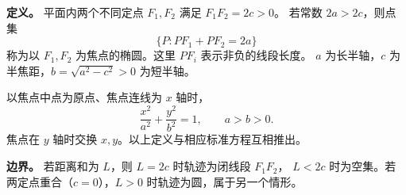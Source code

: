 \begin{statementbox}
\textbf{定义。} 平面内两个不同定点 $F_1,F_2$ 满足 $F_1F_2=2c>0$。
若常数 $2a>2c$，则点集
\[
\boxed{\{P:PF_1+PF_2=2a\}}
\]
称为以 $F_1,F_2$ 为焦点的椭圆。这里 $PF_i$ 表示非负的线段长度。
$a$ 为长半轴，$c$ 为半焦距，$b=\sqrt{a^2-c^2}>0$ 为短半轴。

以焦点中点为原点、焦点连线为 $x$ 轴时，
\[
\boxed{\frac{x^2}{a^2}+\frac{y^2}{b^2}=1},\qquad a>b>0.
\]
焦点在 $y$ 轴时交换 $x,y$。以上定义与相应标准方程互相推出。

\textbf{边界。} 若距离和为 $L$，则 $L=2c$ 时轨迹为闭线段 $F_1F_2$，
$L<2c$ 时为空集。若两定点重合（$c=0$），$L>0$ 时轨迹为圆，属于另一个情形。
\end{statementbox}

